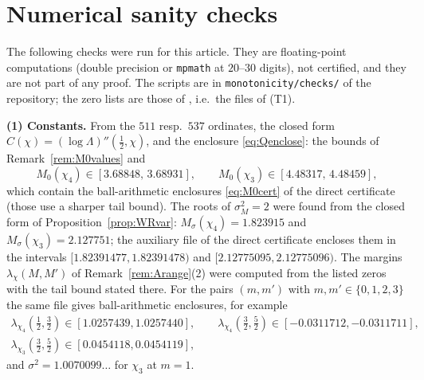 \documentclass[11pt]{amsart}
\theoremstyle{definition}
\numberwithin{equation}{section}
\begin{document}
\section{Numerical sanity checks}\label{sec:numerics}

The following checks were run for this article. They are
floating-point computations (double precision or \texttt{mpmath} at
$20$--$30$ digits), not certified, and they are not part of any proof.
The scripts are in \texttt{monotonicity/checks/} of the repository;
the zero lists are those of \cite[\S7]{WR}, i.e.\ the files of (T1).

\medskip\noindent\textbf{(1) Constants.} From the $511$ resp.\ $537$
ordinates, the closed form $C(\chi)=(\log\Lambda)''(\tfrac12,\chi)$,
and the enclosure \eqref{eq:Qenclose}: the bounds of
Remark~\ref{rem:M0values} and
\[
M_0(\chi_4)\in[3.68848,\,3.68931],\qquad
M_0(\chi_3)\in[4.48317,\,4.48459],
\]
which contain the ball-arithmetic enclosures \eqref{eq:M0cert} of the
direct certificate (those use a sharper tail bound). The roots of
$\sigma_M^2=2$ were found from the closed form of
Proposition~\ref{prop:WRvar}: $M_\sigma(\chi_4)=1.823915$ and
$M_\sigma(\chi_3)=2.127751$; the auxiliary file of the direct
certificate encloses them in the intervals $[1.82391477,1.82391478)$ and
$[2.12775095,2.12775096)$. The margins $\lambda_\chi(M,M')$ of
Remark~\ref{rem:Arange}(2) were computed from the listed zeros with
the tail bound stated there. For the pairs $(m,m')$ with
$m,m'\in\{0,1,2,3\}$ the same file gives
ball-arithmetic enclosures, for example
\begin{gather*}
\lambda_{\chi_4}(\tfrac12,\tfrac32)\in[1.0257439,1.0257440],\qquad
\lambda_{\chi_4}(\tfrac32,\tfrac52)\in[-0.0311712,-0.0311711],\\
\lambda_{\chi_3}(\tfrac32,\tfrac52)\in[0.0454118,0.0454119],
\end{gather*}
and $\sigma^2=1.0070099\ldots$ for $\chi_3$ at $m=1$.
\end{document}
